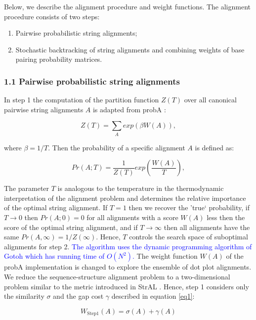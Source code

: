 \documentclass{bmcart}
\begin{document}
Below, we describe the alignment procedure and weight functions.
The alignment procedure consists of two steps:
\begin{enumerate}
  \item Pairwise probabilistic string alignments; 
  \item Stochastic backtracking of string alignments and combining
	  weights of base pairing probability matrices.
\end{enumerate}

\subsubsection*{1.1 Pairwise probabilistic string alignments}
In step 1 the computation of the partition function $Z(T)$ over all canonical pairwise
string alignments $A$ is adapted from probA \cite{Muckstein12385998}:

\begin{equation}\label{probA_Z}
	Z(T) = \sum_A exp( \beta W(A) ),
\end{equation}

\noindent where $\beta = 1/T$. Then the probability of a specific alignment $A$ is defined as:

\begin{equation}\label{probA}
	Pr(A;T) = \frac{1}{Z(T)} exp( \frac{W(A)}{T} ),
\end{equation}

\noindent The parameter $T$ is analogous to the temperature in the
thermodynamic interpretation of the alignment problem and determines the
relative importance of the optimal string alignment. If $T=1$ then we recover the
'true` probability, if $T\to0$ then $Pr(A;0)=0$ for all alignments with a score
$W(A)$ less then the score of the optimal string alignment, and if $T\to\infty$ then
all alignments have the same $Pr(A,\infty)=1/Z(\infty)$.  Hence, $T$ controls
the search space of suboptimal alignments for step 2. \textcolor{blue}{
The algorithm uses the dynamic programming algorithm of Gotoh \cite{Gotoh7166760} which has running time of $O(N^2)$.} 
The weight function $W(A)$ of
the probA implementation is changed to explore the ensemble of dot plot
alignments. We reduce the sequence-structure alignment problem to a
two-dimensional problem similar to the metric introduced in StrAL
\cite{Dalli16613908}. Hence, step 1 considers only the similarity $\sigma$ and
the gap cost $\gamma$ described in equation \ref{eq1}:

\begin{equation}\label{wstep1}
	W_{\mbox{Step1}}(A) = \sigma(A) + \gamma(A)
\end{equation}
\end{document}
